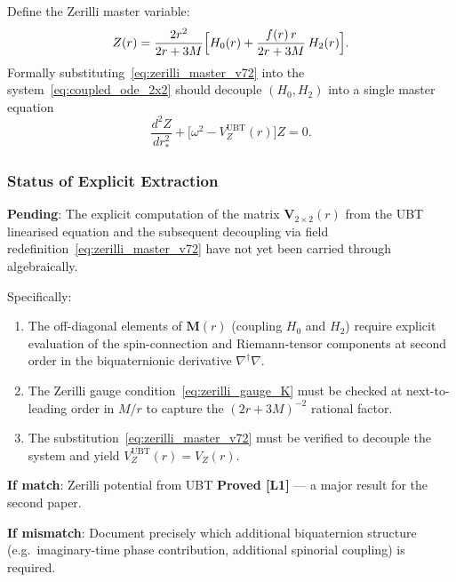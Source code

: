 \documentclass[12pt]{article}
\theoremstyle{definition}
\theoremstyle{remark}
\begin{document}
Define the Zerilli master variable:
\begin{equation}
  Z(r) = \frac{2r^2}{2r + 3M}
    \Bigl[H_0(r) + \frac{f(r)\,r}{2r+3M}\,H_2(r)\Bigr].
  \label{eq:zerilli_master_v72}
\end{equation}
Formally substituting~\eqref{eq:zerilli_master_v72} into the
system~\eqref{eq:coupled_ode_2x2} should decouple $(H_0, H_2)$ into a
single master equation
\begin{equation}
  \frac{d^2 Z}{dr_*^2} + \bigl[\omega^2 - V_Z^{\text{UBT}}(r)\bigr]Z = 0.
  \label{eq:zerilli_master_eq_v72}
\end{equation}

\subsubsection{Status of Explicit Extraction}

\noindent\textbf{Pending}: The explicit computation of the matrix
$\mathbf{V}_{2\times2}(r)$ from the UBT linearised equation and the
subsequent decoupling via field redefinition~\eqref{eq:zerilli_master_v72}
have not yet been carried through algebraically.

Specifically:
\begin{enumerate}
  \item The off-diagonal elements of $\mathbf{M}(r)$ (coupling $H_0$ and
        $H_2$) require explicit evaluation of the spin-connection and
        Riemann-tensor components at second order in the biquaternionic
        derivative $\nabla^\dagger\nabla$.
  \item The Zerilli gauge condition~\eqref{eq:zerilli_gauge_K} must be
        checked at next-to-leading order in $M/r$ to capture the
        $(2r+3M)^{-2}$ rational factor.
  \item The substitution~\eqref{eq:zerilli_master_v72} must be verified
        to decouple the system and yield $V_Z^{\text{UBT}}(r) = V_Z(r)$.
\end{enumerate}

\noindent\textbf{If match}: Zerilli potential from UBT \textbf{Proved [L1]}
— a major result for the second paper.

\noindent\textbf{If mismatch}: Document precisely which additional
biquaternion structure (e.g.\ imaginary-time phase contribution,
additional spinorial coupling) is required.
\end{document}
